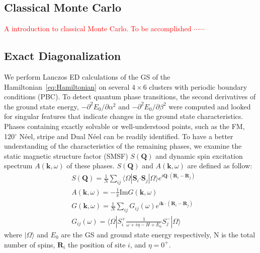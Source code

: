 \documentclass[aps,prb,reprint,amsfonts,amsmath,amssymb,showpacs,groupedaddress,superscriptaddress]{revtex4-1}
\begin{document}
\subsection{\label{sec:SectionIIA}Classical Monte Carlo}
\textcolor{red}{A introduction to classical Monte Carlo. To be accomplished $\cdots \cdots$}

\subsection{\label{sec:SectionIIB}Exact Diagonalization}
We perform Lanczos ED calculations of the GS of the Hamiltonian~\eqref{eq:Hamiltonian} on several $4 \times 6$ clusters with periodic boundary conditions (PBC). To detect quantum phase transitions, the second derivatives of the ground state energy, $-\partial^2E_0/\partial\alpha^2$ and $-\partial^2E_0/\partial\beta^2$ were computed and looked for singular features that indicate changes in the ground state characteristics. Phases containing exactly solvable or well-understood points, such as the FM, 120$^\circ$ N\'{e}el, stripe and Dual N\'{e}el can be readily identified. To have a better understanding of the characteristics of the remaining phases, we examine the static magnetic structure factor (SMSF) $S(\bm{Q})$ and dynamic spin excitation spectrum $A(\bm{k}, \omega)$ of these phases. $S(\bm{Q})$ and $A(\bm{k}, \omega)$ are defined as follow:
\begin{subequations}
    \begin{align}
        & S(\bm{Q}) = \frac{1}{N} \sum_{ij} \langle \Omega | \bm{S}_i \bm{\cdot} \bm{S}_j | \Omega \rangle e^{i \bm{Q} \bm{\cdot} (\bm{R}_i - \bm{R}_j)} \label{eq:SMSF} \\
        & A(\bm{k}, \omega) = -\frac{1}{\pi} \text{Im} G(\bm{k}, \omega) \label{eq:Akomega} \\
        & G(\bm{k}, \omega) = \frac{1}{N} \sum_{ij} G_{ij}(\omega) e^{i \bm{k} \cdot (\bm{R}_i - \bm{R}_j)} \\
        & G_{ij}(\omega) = \langle \Omega | S_i^{+} \frac{1}{\omega + i\eta - H + E_0} S_j^{-} | \Omega \rangle \label{eq:GreenFunction}
    \end{align}
\end{subequations}
where $| \Omega \rangle$ and $E_0$ are the GS and ground state energy respectively, N is the total number of spins, $\bm{R}_i$ the position of site $i$, and $\eta = 0^+$.
\end{document}
